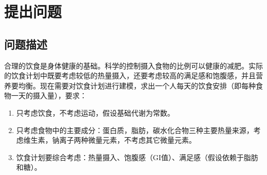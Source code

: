 \documentclass{SYSUReport}
\date{2023年11月22日}
\begin{document}
\cover
\thispagestyle{empty} %
\clearpage

%
%


\setcounter{page}{1}
\tableofcontents
\clearpage

\setcounter{page}{1}


\section{提出问题}
\subsection{问题描述}

合理的饮食是身体健康的基础。科学的控制摄入食物的比例可以健康的减肥。实际的饮食计划中既要考虑较低的热量摄入，还要考虑较高的满足感和饱腹感，并且营养要均衡。现在需要对饮食计划进行建模，求出一个人每天的饮食安排（即每种食物一天的摄入量），要求：
\begin{enumerate}
    \item 只考虑饮食，不考虑运动，假设基础代谢为常数。    \vspace{-0.3cm}
    \item 只考虑食物中的主要成分：蛋白质，脂肪，碳水化合物三种主要热量来源，考虑维生素，钠离子两种微量元素，不考虑其它微量元素。    \vspace{-0.3cm}    
    \item 饮食计划要综合考虑：热量摄入、饱腹感（GI值）、满足感（假设依赖于脂肪和糖）。    \vspace{-0.3cm}
\end{enumerate}
\end{document}
